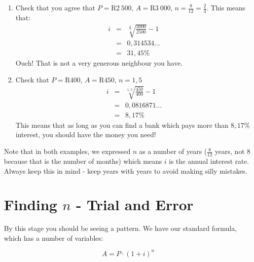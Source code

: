 \begin{enumerate}
\item{Check that you agree that $P=$R$2~500$, $A=$R$3~000$, $n= \frac{8}{12}=\frac{2}{3}$. This means that:
\begin{eqnarray*}
i &=& \sqrt[\frac{2}{3}]{\frac{3000}{2500}} - 1\\
&=& 0,314534...\\
&=& 31,45\%
\end{eqnarray*}
Ouch! That is not a very generous neighbour you have.}

\item{Check that $P=$R$400$, $A=$R$450$, $n=1,5$
\begin{eqnarray*}
i &=& \sqrt[1,5]{\frac{450}{400}} - 1\\
&=& 0,0816871...\\
&=& 8,17\%
\end{eqnarray*}
This means that as long as you can find a bank which pays more than $8,17\%$ interest, you should have the money you need!}
\end{enumerate}

Note that in both examples, we expressed $n$ as a number of years ($\frac{8}{12}$ years, not $8$ because that is the number of months) which means $i$ is the annual interest rate. Always keep this in mind - keep years with years to avoid making silly mistakes.


\section{Finding $n$ - Trial and Error}
\label{sec:m:f11:term}
By this stage you should be seeing a pattern. We have our standard formula, which has a number of variables:

\begin{equation*}
A = P \cdot (1+i)^n
\end{equation*}

